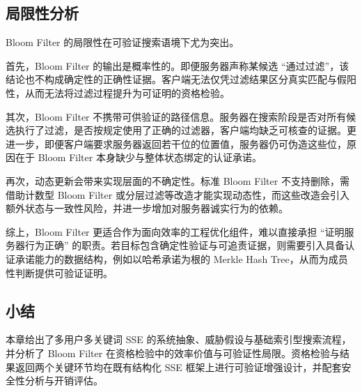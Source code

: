 \subsection{局限性分析}
Bloom Filter 的局限性在可验证搜索语境下尤为突出。

首先，Bloom Filter 的输出是概率性的。即便服务器声称某候选 ``通过过滤''，该结论也不构成确定性的正确性证据。客户端无法仅凭过滤结果区分真实匹配与假阳性，从而无法将过滤过程提升为可证明的资格检验。

其次，Bloom Filter 不携带可供验证的路径信息。服务器在搜索阶段是否对所有候选执行了过滤，是否按规定使用了正确的过滤器，客户端均缺乏可核查的证据。更进一步，即便客户端要求服务器返回若干位的位置值，服务器仍可伪造这些位，原因在于 Bloom Filter 本身缺少与整体状态绑定的认证承诺。

再次，动态更新会带来实现层面的不确定性。标准 Bloom Filter 不支持删除，需借助计数型 Bloom Filter 或分层过滤等改造才能实现动态性，而这些改造会引入额外状态与一致性风险，并进一步增加对服务器诚实行为的依赖。

综上，Bloom Filter 更适合作为面向效率的工程优化组件，难以直接承担 ``证明服务器行为正确'' 的职责。若目标包含确定性验证与可追责证据，则需要引入具备认证承诺能力的数据结构，例如以哈希承诺为根的 Merkle Hash Tree，从而为成员性判断提供可验证证明。\cite{merkle1979}

\subsection{小结}
本章给出了多用户多关键词 SSE 的系统抽象、威胁假设与基础索引型搜索流程，并分析了 Bloom Filter 在资格检验中的效率价值与可验证性局限。资格检验与结果返回两个关键环节均在既有结构化 SSE 框架上进行可验证增强设计，并配套安全性分析与开销评估。
